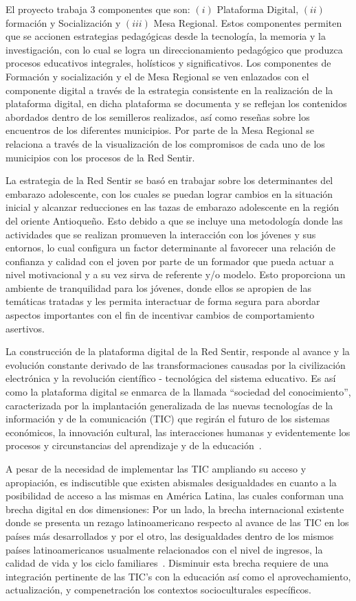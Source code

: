 \documentclass[journal,transmag]{IEEEtran}
\begin{document}
El proyecto trabaja 3 componentes que son: $(i)$ Plataforma Digital, $(ii)$ formación y Socialización y $(iii)$ Mesa Regional. Estos componentes permiten que se accionen estrategias pedagógicas desde la tecnología, la memoria y la investigación, con lo cual se logra un direccionamiento pedagógico que produzca procesos educativos integrales, holísticos y significativos. Los componentes de Formación y socialización y el de Mesa Regional se ven enlazados con el componente digital a través de la estrategia consistente en la realización de la plataforma digital, en dicha plataforma se documenta y se reflejan los contenidos abordados dentro de los semilleros realizados, así como reseñas sobre los encuentros de los diferentes municipios. Por parte de la Mesa Regional se relaciona a través de la visualización de los compromisos de cada uno de los municipios con los procesos de la Red Sentir.

La estrategia de la Red Sentir se basó en trabajar sobre los determinantes del embarazo adolescente, con los cuales se puedan lograr cambios en la situación inicial y alcanzar reducciones en las tazas de embarazo adolescente en la región del oriente Antioqueño. Esto debido a que se incluye una metodología donde las actividades que se realizan promueven la interacción con los jóvenes y sus entornos, lo cual configura un factor determinante al favorecer una relación de confianza y calidad con el joven por parte de un formador que pueda actuar a nivel motivacional y a su vez sirva de referente y/o modelo. Esto proporciona un ambiente de tranquilidad para los jóvenes, donde ellos se apropien de las temáticas tratadas y les permita interactuar de forma segura para abordar aspectos importantes con el fin de incentivar cambios de comportamiento asertivos.

La construcción de la plataforma digital de la Red Sentir, responde al avance y la evolución constante derivado de las transformaciones causadas por la civilización electrónica y la revolución científico - tecnológica del sistema educativo. Es así como la plataforma digital se enmarca de la llamada ``sociedad del conocimiento'', caracterizada por la implantación generalizada de las nuevas tecnologías de la información y de la comunicación (TIC) que regirán el futuro de los sistemas económicos, la innovación cultural, las interacciones humanas y evidentemente los procesos y circunstancias del aprendizaje y de la educación~\cite{Asin2009}.

A pesar de la necesidad de implementar las TIC ampliando su acceso y apropiación, es indiscutible que existen abismales desigualdades en cuanto a la posibilidad de acceso a las mismas en América Latina, las cuales conforman una brecha digital en dos dimensiones: Por un lado, la brecha internacional existente donde se presenta un rezago latinoamericano respecto al avance de las TIC en los países más desarrollados y por el otro, las desigualdades dentro de los mismos países latinoamericanos usualmente relacionados con el nivel de ingresos, la calidad de vida y los ciclo familiares~\cite{Sunkel2006}. Disminuir esta brecha requiere de una integración pertinente de las TIC's con la educación así como el aprovechamiento, actualización, y compenetración los contextos socioculturales específicos.
\end{document}
